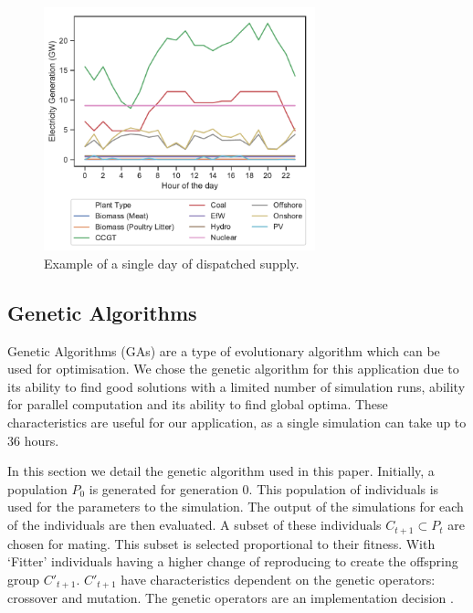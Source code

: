 \begin{figure}
	\centering
	\includegraphics[width=0.7\textwidth]{Chapter4/figures/e-Energy-2020/methods_and_materials/clusters_results_single_day.pdf}
	\caption{Example of a single day of dispatched supply.}
	\label{fig:single_dispatched_day}
\end{figure}




\subsection{Genetic Algorithms}

Genetic Algorithms (GAs) are a type of evolutionary algorithm which can be used for optimisation. We chose the genetic algorithm for this application due to its ability to find good solutions with a limited number of simulation runs, ability for parallel computation and its ability to find global optima. These characteristics are useful for our application, as a single simulation can take up to 36 hours. 

In this section we detail the genetic algorithm used in this paper. Initially, a population $P_{0}$ is generated for generation 0. This population of individuals is used for the parameters to the simulation. The output of the simulations for each of the individuals are then evaluated. A subset of these individuals $C_{t+1} \subset P_{t}$ are chosen for mating. This subset is selected proportional to their fitness. With `Fitter' individuals having a higher change of reproducing to create the offspring group $C'_{t+1}$. $C'_{t+1}$ have characteristics dependent on the genetic operators: crossover and mutation. The genetic operators are an implementation decision \cite{FogelDavidB2009}. 

